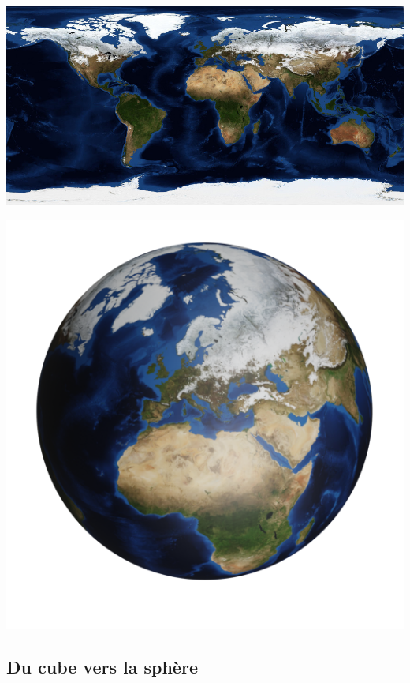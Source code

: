 \documentclass[11pt,class=report,crop=false]{standalone}
\begin{document}
\begin{center}
	\begin{minipage}{0.45\textwidth}
    \includegraphics[scale=\myscale,scale=0.8]{figures/carte-monde-nasa}
    \end{minipage}\qquad 
	\begin{minipage}{0.5\textwidth}
    \includegraphics[scale=\myscale,scale=0.35,trim={0 2cm 0 1cm},clip]{figures/sphere-texture}    
    \end{minipage}
\end{center}


\subsection{Du cube vers la sphère}
\end{document}
